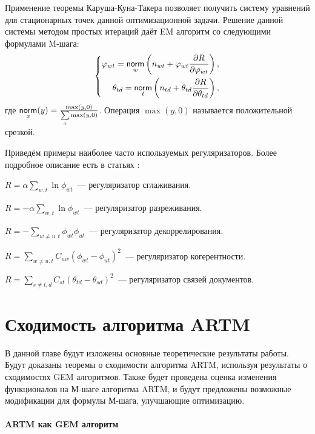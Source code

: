 \documentclass[12pt, twoside]{article}
\begin{document}
Применение теоремы Каруша-Куна-Такера позволяет получить систему уравнений для стационарных точек данной оптимизационной задачи. Решение данной системы методом простых итераций даёт EM алгоритм со следующими формулами M-шага:
\[
\left\{
	\begin{aligned}
\varphi_{wt} = \mathop{\mathsf{norm}}\limits_w  \left(n_{wt} + \varphi_{wt}\frac{\partial R}{\partial\varphi_{wt}}\right),\\
\theta_{td} = \mathop{\mathsf{norm}}\limits_t  \left(n_{td} + \theta_{td}\frac{\partial R}{\partial\theta_{td}}\right),
	\end{aligned}
\right.
\]
где $\norm_x(y) = \frac{\max(y, 0)}{\sum\limits_x \max(y, 0)}$. Операция $\max(y, 0)$ называется положительной срезкой.

Приведём примеры наиболее часто используемых регуляризаторов. Более подробное описание есть в статьях \cite{vorontsov2014additive, vorontsov2014tutorial, vorontsov2015additive}:
\begin{enumerate*}
\item $R = \alpha \sum\limits_{w, t} \ln \phi_{wt}$~--- регуляризатор сглаживания.
\item $R = -\alpha \sum\limits_{w, t} \ln \phi_{wt}$~--- регуляризатор разреживания.
\item $R = -\sum\limits_{w \neq u, t} \phi_{wt} \phi_{ut}$~--- регуляризатор декоррелирования.
\item $R = \sum\limits_{w \neq u, t} C_{uw}\left( \phi_{wt}  - \phi_{ut} \right)^2$~--- регуляризатор когерентности.
\item $R = \sum\limits_{s \neq t, d} C_{st}\left( \theta_{td}  - \theta_{sd} \right)^2$~--- регуляризатор связей документов.
\end{enumerate*}


\section{Сходимость алгоритма ARTM}
	В данной главе будут изложены основные теоретические результаты работы. Будут доказаны теоремы о сходимости алгоритма ARTM, используя результаты о сходимостях GEM алгоритмов. Также будет проведена оценка изменения функционалов на М-шаге алгоритма ARTM, и будут предложены возможные модификации для формулы М-шага, улучшающие оптимизацию. 
	
\paragraph{ARTM как GEM алгоритм}
\label{subsec:artmasgem}
\end{document}
